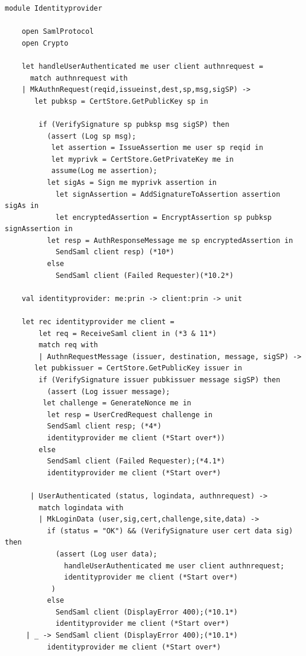 \documentclass[twosided]{report}
\begin{document}
\begin{lstlisting}[style=fstar, caption={Jacob's Identity Provider 
Implementation}]
	module Identityprovider

	open SamlProtocol
	open Crypto

	let handleUserAuthenticated me user client authnrequest =
	  match authnrequest with 
  	| MkAuthnRequest(reqid,issueinst,dest,sp,msg,sigSP) ->
   	   let pubksp = CertStore.GetPublicKey sp in
      
  	    if (VerifySignature sp pubksp msg sigSP) then
  	      (assert (Log sp msg);
 	       let assertion = IssueAssertion me user sp reqid in
 	       let myprivk = CertStore.GetPrivateKey me in
 	       assume(Log me assertion);
  	      let sigAs = Sign me myprivk assertion in
	        let signAssertion = AddSignatureToAssertion assertion sigAs in
	        let encryptedAssertion = EncryptAssertion sp pubksp 
signAssertion in
  	      let resp = AuthResponseMessage me sp encryptedAssertion in
	        SendSaml client resp) (*10*)
	      else
	        SendSaml client (Failed Requester)(*10.2*)

	val identityprovider: me:prin -> client:prin -> unit

	let rec identityprovider me client =
		let req = ReceiveSaml client in (*3 & 11*)
		match req with
		| AuthnRequestMessage (issuer, destination, message, sigSP) ->
 	   let pubkissuer = CertStore.GetPublicKey issuer in
	    if (VerifySignature issuer pubkissuer message sigSP) then
	      (assert (Log issuer message);
 	     let challenge = GenerateNonce me in
	      let resp = UserCredRequest challenge in
	      SendSaml client resp; (*4*)
	      identityprovider me client (*Start over*))
	    else
	      SendSaml client (Failed Requester);(*4.1*)
	      identityprovider me client (*Start over*)

	  | UserAuthenticated (status, logindata, authnrequest) ->
	    match logindata with 
	    | MkLoginData (user,sig,cert,challenge,site,data) ->
	      if (status = "OK") && (VerifySignature user cert data sig) then
	        (assert (Log user data);
	          handleUserAuthenticated me user client authnrequest;
	          identityprovider me client (*Start over*)
 	       )
	      else
	        SendSaml client (DisplayError 400);(*10.1*)
	        identityprovider me client (*Start over*)
 	 | _ -> SendSaml client (DisplayError 400);(*10.1*)
  	      identityprovider me client (*Start over*)
\end{lstlisting}
\end{document}
